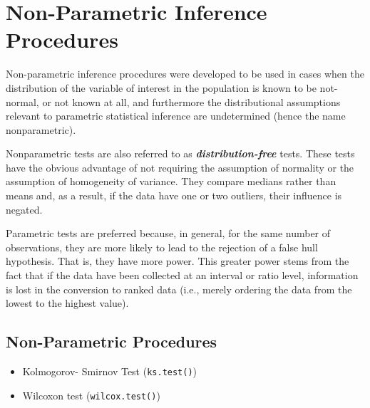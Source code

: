 \documentclass[a4paper,12pt]{article}
\begin{document}
\tableofcontents
\newpage

\section{Non-Parametric Inference Procedures}
Non-parametric inference procedures were developed to be used in cases when the distribution of the variable of interest in the population is known to be not-normal, or not known at all, and furthermore the distributional assumptions relevant to parametric statistical inference are undetermined (hence the name nonparametric).

Nonparametric tests are also referred to as \textbf{\emph{distribution-free}} tests. These tests have the obvious advantage of not requiring the assumption of normality or the assumption of homogeneity of variance. They compare medians rather than means and, as a result, if the data have one or two outliers, their influence is negated.

Parametric tests are preferred because, in general, for the same number of observations, they are more likely to lead to the rejection of a false hull hypothesis. That is, they have more power. This greater power stems from the fact that if the data have been collected at an interval or ratio level, information is lost in the conversion to ranked data (i.e., merely ordering the data from the lowest to the highest value).


\subsection{Non-Parametric Procedures}
\begin{itemize}
\item Kolmogorov- Smirnov Test (\texttt{ks.test()})
\item Wilcoxon test (\texttt{wilcox.test()})
\end{itemize}
\end{document}
